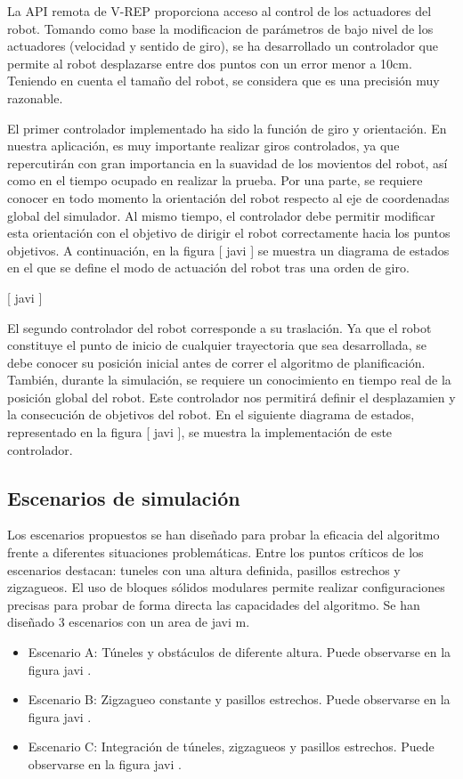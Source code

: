 La API remota de V-REP proporciona acceso al control de los actuadores del robot. Tomando como base la modificacion de parámetros de bajo nivel de los actuadores (velocidad y sentido de giro), se ha desarrollado un controlador que permite al robot desplazarse entre dos puntos con un error menor a 10cm. Teniendo en cuenta el tamaño del robot, se considera que es una precisión muy razonable.

El primer controlador implementado ha sido la función de giro y orientación. En nuestra aplicación, es muy importante realizar giros controlados, ya que repercutirán con gran importancia en la suavidad de los movientos del robot, así como en el tiempo ocupado en realizar la prueba. Por una parte, se requiere conocer en todo momento la orientación del robot respecto al eje de coordenadas global del simulador. Al mismo tiempo, el controlador debe permitir modificar esta orientación con el objetivo de dirigir el robot correctamente hacia los puntos objetivos. A continuación, en la figura [ javi ] se muestra un diagrama de estados en el que se define el modo de actuación del robot tras una orden de giro.

[ javi ]

El segundo controlador del robot corresponde a su traslación. Ya que el robot constituye el punto de inicio de cualquier trayectoria que sea desarrollada, se debe conocer su posición inicial antes de correr el algoritmo de planificación. También, durante la simulación, se requiere un conocimiento en tiempo real de la posición global del robot. Este controlador nos permitirá definir el desplazamien y la consecución de objetivos del robot. En el siguiente diagrama de estados, representado en la figura [ javi ], se muestra la implementación de este controlador.

\subsection{Escenarios de simulación}

Los escenarios propuestos se han diseñado para probar la eficacia del algoritmo frente a diferentes situaciones problemáticas. Entre los puntos críticos de los escenarios destacan: tuneles con una altura definida, pasillos estrechos y zigzagueos. El uso de bloques sólidos modulares permite realizar configuraciones precisas para probar de forma directa las capacidades del algoritmo. Se han diseñado 3 escenarios con un area de javi m.

\begin{itemize}
	\item Escenario A: Túneles y obstáculos de diferente altura. Puede observarse en la figura javi .	
	\item Escenario B: Zigzagueo constante y pasillos estrechos. Puede observarse en la figura javi .
	\item Escenario C: Integración de túneles, zigzagueos y pasillos estrechos. Puede observarse en la figura javi .
\end{itemize}

